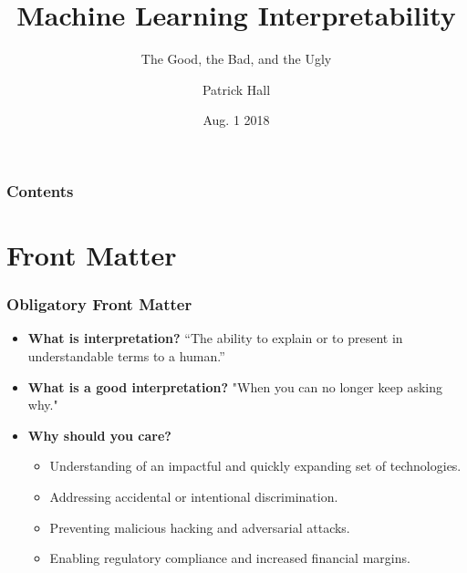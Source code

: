 \documentclass[11pt,
               aspectratio=169
               ]{beamer}
\author{Patrick Hall}
\title{Machine Learning Interpretability}
\subtitle{The Good, the Bad, and the Ugly}
\institute{\href{https://www.h2o.ai}{H\textsubscript{2}O.ai}}
\date{Aug. 1 2018}
\begin{document}
	
	\maketitle
	
	\begin{frame}
	
		\frametitle{Contents}
		
		\tableofcontents{}
		
	\end{frame}

	\section{Front Matter}
	
		\begin{frame}
		
			\frametitle{Obligatory Front Matter}
			
				\begin{itemize}
					
					\item \textbf{What is interpretation?} “The	ability	to explain or to present in understandable terms to	a human.” \cite{been_kim1}
					
					\item \textbf{What is a good interpretation?} "When you can no longer keep asking why." \cite{gilpin2018explaining}
					
					\item \textbf{Why should you care?}
					\begin{itemize}
						\item Understanding of an impactful and quickly expanding set of technologies. 
						\item Addressing accidental or intentional discrimination.
						\item Preventing malicious hacking and adversarial attacks.
						\item Enabling regulatory compliance and increased financial margins.
					\end{itemize}
					
				\end{itemize}
			
		\end{frame}

\end{document}
